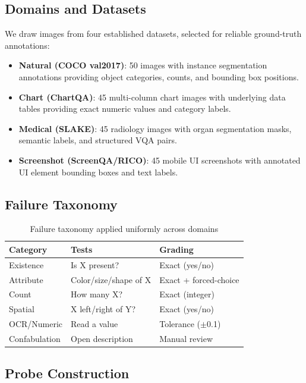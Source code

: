 \documentclass[conference]{IEEEtran}
\begin{document}
\subsection{Domains and Datasets}

We draw images from four established datasets, selected for reliable ground-truth annotations:

\begin{itemize}
\item \textbf{Natural (COCO val2017)}: 50 images with instance segmentation annotations providing object categories, counts, and bounding box positions.
\item \textbf{Chart (ChartQA)}: 45 multi-column chart images with underlying data tables providing exact numeric values and category labels.
\item \textbf{Medical (SLAKE)}: 45 radiology images with organ segmentation masks, semantic labels, and structured VQA pairs.
\item \textbf{Screenshot (ScreenQA/RICO)}: 45 mobile UI screenshots with annotated UI element bounding boxes and text labels.
\end{itemize}

\subsection{Failure Taxonomy}

\begin{table}[t]
\caption{Failure taxonomy applied uniformly across domains}
\label{tab:taxonomy}
\centering
\small
\begin{tabular}{@{}lll@{}}
\toprule
Category & Tests & Grading \\
\midrule
Existence & Is X present? & Exact (yes/no) \\
Attribute & Color/size/shape of X & Exact + forced-choice \\
Count & How many X? & Exact (integer) \\
Spatial & X left/right of Y? & Exact (yes/no) \\
OCR/Numeric & Read a value & Tolerance ($\pm$0.1) \\
Confabulation & Open description & Manual review \\
\bottomrule
\end{tabular}
\end{table}

\subsection{Probe Construction}
\end{document}
